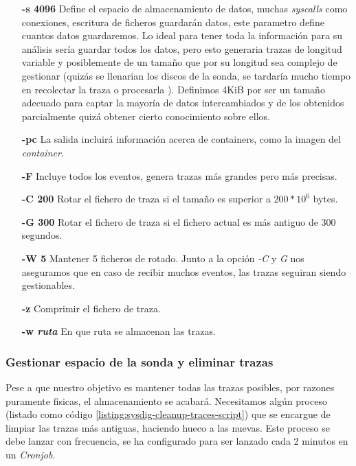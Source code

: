 \begin{itemize}
    \item[\textbf{-s 4096}] Define el espacio de almacenamiento de datos, muchas \emph{syscalls} como conexiones, escritura de ficheros guardarán datos, este parametro define 
    cuantos datos guardaremos. Lo ideal para tener toda la información para su análisis sería guardar todos los datos, pero esto generaria trazas de longitud variable 
    y posiblemente de un tamaño que por su longitud sea complejo de gestionar (quizás se llenarian los discos de la sonda, se tardaría mucho tiempo en recolectar la traza o procesarla ). 
    Definimos 4KiB por ser un tamaño adecuado para captar la mayoría de datos intercambiados y de los obtenidos parcialmente quizá obtener cierto conocimiento sobre ellos. 
    \item[\textbf{-pc}] La salida incluirá información acerca de containers, como la imagen del \emph{container}.
    \item[\textbf{-F}] Incluye todos los eventos, genera trazas más grandes pero más precisas.
    \item[\textbf{-C 200}] Rotar el fichero de traza si el tamaño es superior a $200 * 10^6$ bytes.
    \item[\textbf{-G 300}] Rotar el fichero de traza si el fichero actual es más antiguo de 300 segundos.
    \item[\textbf{-W 5}] Mantener 5 ficheros de rotado. Junto a la opción \emph{-C} y \emph{G} nos aseguramos que en caso
    de recibir muchos eventos, las trazas seguiran siendo gestionables.
    \item[\textbf{-z}] Comprimir el fichero de traza.
    \item[\textbf{-w \emph{ruta}}] En que ruta se almacenan las trazas.
\end{itemize}

   

\subsubsection{Gestionar espacio de la sonda y eliminar trazas}

Pese a que nuestro objetivo es mantener todas las trazas posibles, por razones puramente fisicas,
el almacenamiento se acabará. Necesitamos algún proceso (listado como código \ref{listing:sysdig-cleanup-traces-script}) que se encargue de limpiar las trazas más antiguas, haciendo
hueco a las nuevas. Este proceso se debe lanzar con frecuencia, se ha configurado para ser lanzado cada 2 minutos en un \emph{Cronjob}.

